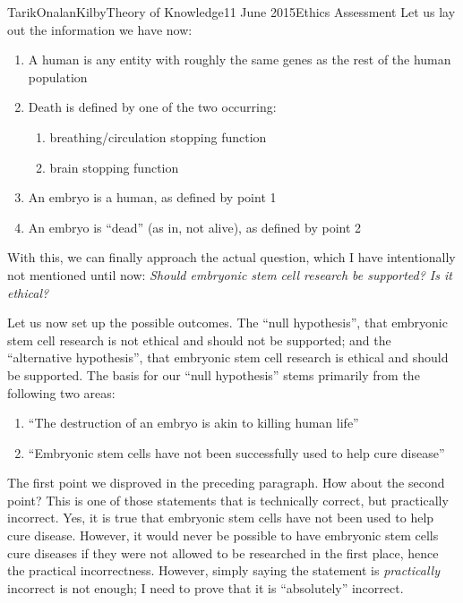 \documentclass[a4paper,12pt]{article}
\begin{document}
\begin{mla}{Tarik}{Onalan}{Kilby}{Theory of Knowledge}{11 June 2015}{Ethics Assessment}
            Let us lay out the information we have now:
            \begin{enumerate}
                \item A human is any entity with roughly the same genes as the rest of the human population
                \item Death is defined by one of the two occurring:
                \begin{enumerate}
                    \item breathing/circulation stopping function
                    \item brain stopping function
                \end{enumerate}
                \item An embryo is a human, as defined by point 1
                \item An embryo is ``dead'' (as in, not alive), as defined by point 2
            \end{enumerate}
            With this, we can finally approach the actual question, which I have intentionally not
            mentioned until now: \textit{Should embryonic stem cell research be supported? Is it
            ethical?}

            Let us now set up the possible outcomes. The ``null hypothesis'', that embryonic stem cell
            research is not ethical and should not be supported; and the ``alternative hypothesis'',
            that embryonic stem cell research is ethical and should be supported. The basis for our
            ``null hypothesis'' stems primarily from the following two areas:
            \begin{enumerate}
                \item ``The destruction of an embryo is akin to killing human life''
                \item ``Embryonic stem cells have not been successfully used to help cure disease''
            \end{enumerate}
            \autocite{beliefs}

            The first point we disproved in the preceding paragraph. How about the second point? This
            is one of those statements that is technically correct, but practically incorrect. Yes,
            it is true that embryonic stem cells have not been used to help cure disease. However, it
            would never be possible to have embryonic stem cells cure diseases if they were not allowed
            to be researched in the first place, hence the practical incorrectness. However, simply
            saying the statement is \textit{practically} incorrect is not enough; I need to prove that
            it is ``absolutely'' incorrect.


\end{mla}
\end{document}
